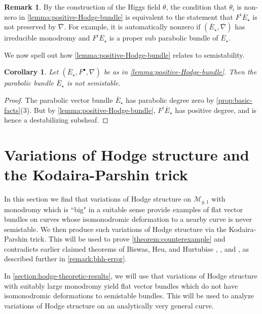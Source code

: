 \documentclass[12 pt]{amsart}
\theoremstyle{plain}
\newtheorem{corollary}[subsubsection]{Corollary}
\theoremstyle{definition}
\newtheorem{remark}[subsubsection]{Remark}
\theoremstyle{remark}
\numberwithin{equation}{section}
\begin{document}
\begin{remark}
    By the construction of the Higgs field $\theta$, the condition that
    $\theta_i$ is non-zero in \autoref{lemma:positive-Hodge-bundle} is
    equivalent to the statement that $F^i\overline{E}_\star$ is not preserved by
    $\overline{\nabla}$. For example, it is automatically nonzero if
    $(\overline{E}_\star, \overline{\nabla})$ has irreducible monodromy and
    $F^i\overline{E}_\star$ is a proper sub parabolic bundle of
    $\overline{E}_\star$.
\end{remark}

We now spell out how \autoref{lemma:positive-Hodge-bundle}
relates to semistability.
\begin{corollary}\label{corollary:unstable}
Let $(\overline{E}_\star, F^\bullet, \nabla)$ be as in
\autoref{lemma:positive-Hodge-bundle}. Then the parabolic bundle
$\overline{E}_\star$ is not semistable.
\end{corollary}
\begin{proof}
    The parabolic vector bundle $\overline{E}_\star$ has parabolic degree zero
    by \autoref{prop:basic-facts}(3). But by
    \autoref{lemma:positive-Hodge-bundle}, $F^i\overline{E}_\star$ has positive degree, and is hence a destabilizing subsheaf.
\end{proof}

\section{Variations of Hodge structure and the Kodaira-Parshin trick}
\label{section:counterexample}

In this section we find that
variations of Hodge structure on $\mathscr{M}_{g,1}$ with monodromy which is
``big" in a suitable sense provide examples of flat vector bundles on curves
whose isomonodromic deformation to a nearby curve is never semistable. We then produce such variations of
Hodge structure via the Kodaira-Parshin trick. 
This will be used to prove
\autoref{theorem:counterexample} and contradicts earlier claimed theorems of
Biswas, Heu, and Hurtubise 
\cite[Theorem 1.3]{BHH:logarithmic},
\cite[Theorem 1.3]{BHH:irregular}, and
\cite[Theorem 1.2]{BHH:parabolic},
as described further in \autoref{remark:bhh-error}.

In \autoref{section:hodge-theoretic-results}, we will use that
variations of Hodge structure with suitably large monodromy yield flat vector
bundles which do not have isomonodromic deformations to semistable bundles.
This will be used to analyze variations of Hodge structure on an analytically very general curve.
\end{document}
